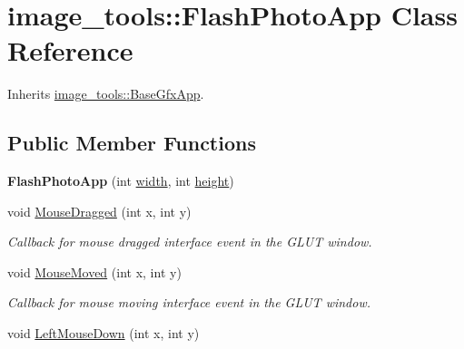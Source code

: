 \hypertarget{classimage__tools_1_1FlashPhotoApp}{}\section{image\+\_\+tools\+:\+:Flash\+Photo\+App Class Reference}
\label{classimage__tools_1_1FlashPhotoApp}


Inherits \hyperlink{classimage__tools_1_1BaseGfxApp}{image\+\_\+tools\+::\+Base\+Gfx\+App}.

\subsection*{Public Member Functions}
\begin{DoxyCompactItemize}
\item 
{\bfseries Flash\+Photo\+App} (int \hyperlink{classimage__tools_1_1BaseGfxApp_a2fe403c5392f624477c2ce4429f1a7b5}{width}, int \hyperlink{classimage__tools_1_1BaseGfxApp_aa961e13a7a8e6062204223cc33ac7503}{height})\hypertarget{classimage__tools_1_1FlashPhotoApp_ae86078388c8a06bae8e708ed15ea4638}{}\label{classimage__tools_1_1FlashPhotoApp_ae86078388c8a06bae8e708ed15ea4638}

\item 
void \hyperlink{classimage__tools_1_1FlashPhotoApp_abe6a6b7ac7664639d5208affe277f6ee}{Mouse\+Dragged} (int x, int y)\hypertarget{classimage__tools_1_1FlashPhotoApp_abe6a6b7ac7664639d5208affe277f6ee}{}\label{classimage__tools_1_1FlashPhotoApp_abe6a6b7ac7664639d5208affe277f6ee}

\begin{DoxyCompactList}\small\item\em Callback for mouse dragged interface event in the G\+L\+UT window. \end{DoxyCompactList}\item 
void \hyperlink{classimage__tools_1_1FlashPhotoApp_abac618c1f5a236dc678674de050cd205}{Mouse\+Moved} (int x, int y)
\begin{DoxyCompactList}\small\item\em Callback for mouse moving interface event in the G\+L\+UT window. \end{DoxyCompactList}\item 
void \hyperlink{classimage__tools_1_1FlashPhotoApp_a6ad65b17915b17d539bf82fb07710c7f}{Left\+Mouse\+Down} (int x, int y)\hypertarget{classimage__tools_1_1FlashPhotoApp_a6ad65b17915b17d539bf82fb07710c7f}{}\label{classimage__tools_1_1FlashPhotoApp_a6ad65b17915b17d539bf82fb07710c7f}


\end{DoxyCompactItemize}
